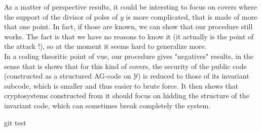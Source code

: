 \documentclass[10pt]{article}
\newcommand{\s}{\vspace{0.3cm}}
\newcommand{\Y}{\mathcal{Y}}
\begin{document}
As a matter of perspective results, it could be intersting to focus on covers where the support of the divisor of poles of $y$ is more complicated, that is made of more that one point. In fact, if those are known, we can show that our procedure still works. The fact is that we have no reasons to know it (it actually is the point of the attack !), so at the moment it seems hard to generalize more. \\
In a coding theoritic point of vue, our procedure gives "negatives" results, in the sense that is shows that for this kind of covers, the security of the public code (constructed as a structured AG-code on $\Y$) is reduced to those of its invariant subcode, which is smaller and thus easier to brute force. It then shows that cryptosystems constructed from it should focus on hidding the structure of the invariant code, which can sometimes break completely the system.

\s

git test

\newpage


\end{document}
